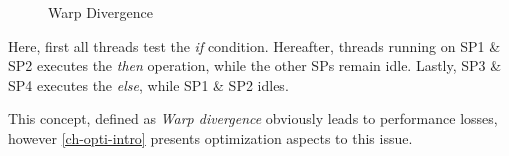 \begin{figure}[ht]
	\centering
	\caption{Warp Divergence}
	\label{fig:hw-warp-div}
\end{figure}

Here, first all threads test the \textit{if} condition.
Hereafter, threads running on SP1 \& SP2 executes the \textit{then} operation, while the other SPs remain idle.
Lastly, SP3 \& SP4 executes the \textit{else}, while SP1 \& SP2 idles.

This concept, defined as \textit{Warp divergence} obviously leads to performance losses, however \cref{ch-opti-intro} presents optimization aspects to this issue. 






